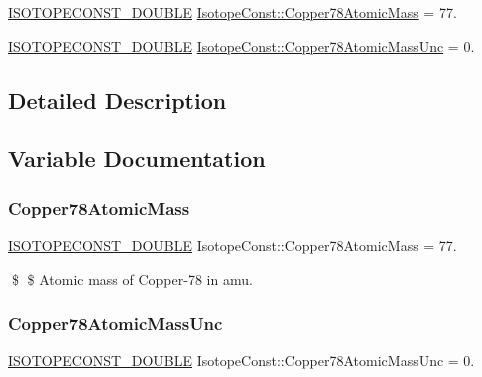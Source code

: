 \begin{DoxyCompactItemize}
\item 
\mbox{\hyperlink{group___isotope_const-_macros_ga8f45a7272ce02c0b4c65c44636ed719a}{I\+S\+O\+T\+O\+P\+E\+C\+O\+N\+S\+T\+\_\+\+D\+O\+U\+B\+LE}} \mbox{\hyperlink{group___isotope_const-_copper-_cu78_gad0a518f2b82e0f53600216b1da4dfeec}{Isotope\+Const\+::\+Copper78\+Atomic\+Mass}} = 77.
\item 
\mbox{\hyperlink{group___isotope_const-_macros_ga8f45a7272ce02c0b4c65c44636ed719a}{I\+S\+O\+T\+O\+P\+E\+C\+O\+N\+S\+T\+\_\+\+D\+O\+U\+B\+LE}} \mbox{\hyperlink{group___isotope_const-_copper-_cu78_ga39646dbc77be773400ad8b942e0a8e01}{Isotope\+Const\+::\+Copper78\+Atomic\+Mass\+Unc}} = 0.
\end{DoxyCompactItemize}


\subsection{Detailed Description}


\subsection{Variable Documentation}
\mbox{\label{group___isotope_const-_copper-_cu78_gad0a518f2b82e0f53600216b1da4dfeec}} 
\subsubsection{\texorpdfstring{Copper78\+Atomic\+Mass}{Copper78AtomicMass}}
{\footnotesize\ttfamily \mbox{\hyperlink{group___isotope_const-_macros_ga8f45a7272ce02c0b4c65c44636ed719a}{I\+S\+O\+T\+O\+P\+E\+C\+O\+N\+S\+T\+\_\+\+D\+O\+U\+B\+LE}} Isotope\+Const\+::\+Copper78\+Atomic\+Mass = 77.}

\$ \$ Atomic mass of Copper-\/78 in amu. \mbox{\label{group___isotope_const-_copper-_cu78_ga39646dbc77be773400ad8b942e0a8e01}} 
\subsubsection{\texorpdfstring{Copper78\+Atomic\+Mass\+Unc}{Copper78AtomicMassUnc}}
{\footnotesize\ttfamily \mbox{\hyperlink{group___isotope_const-_macros_ga8f45a7272ce02c0b4c65c44636ed719a}{I\+S\+O\+T\+O\+P\+E\+C\+O\+N\+S\+T\+\_\+\+D\+O\+U\+B\+LE}} Isotope\+Const\+::\+Copper78\+Atomic\+Mass\+Unc = 0.}

